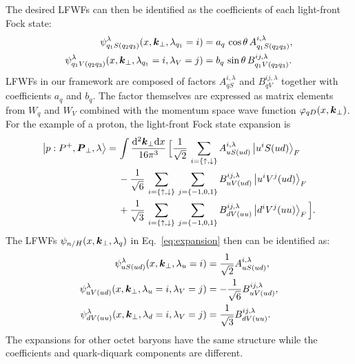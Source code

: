 \documentclass[aps,prc,preprint,groupedaddress,showpacs,superscriptaddress,floatfix]{revtex4-1}
\newcommand{\diff}{\ensuremath\mathrm{d}}
\renewcommand{\vec}[1]{\ensuremath\boldsymbol{#1}}
\begin{document}
%
The desired LFWFs can then be identified as the coefficients of each light-front Fock state:
%
\begin{align}
  \psi_{q_1S(q_2q_3)}^\lambda(x, \vec{k}_\perp, \lambda_{q_1}=i)  &= a_q\,\cos\theta\,A^{i, \lambda}_{q_1S(q_2q_3)}, \label{eq:lfwf1}\\
  \psi_{q_1V(q_2q_3)}^\lambda(x, \vec{k}_\perp, \lambda_{q_1}=i, \lambda_V=j) &= b_q\,\sin\theta\,B^{ij, \lambda}_{q_1V(q_2q_3)}.\label{eq:lfwf2}
\end{align}
%
LFWFs in our framework are composed of factors $A^{i,\lambda}_{qS}$ and $B^{ij,\lambda}_{qV}$ together with coefficients $a_q$ and $b_q$.
The factor themselves are expressed as matrix elements from $W_q$ and $W_V$ combined with the momentum space wave function $\varphi_{qD}(x,\vec{k}_\perp)$.
For the example of a proton, the light-front Fock state expansion is
%
\begin{align}
  \Ket{p:P^+,\vec{P}_\perp,\lambda} =&\,\int\frac{\diff^2 \vec{k}_\perp \diff x}{16\pi^3} 
  \,\Big[ \frac{1}{\sqrt{2}}\, \sum_{i=\{\uparrow,\downarrow\}}
  A^{i,\lambda}_{uS(ud)}\Ket{u^i S(ud)}_F \nonumber \\
  &\,- \frac{1}{\sqrt{6}}\,\sum_{i=\{\uparrow, \downarrow\}}\,\sum_{j=\{-1, 0, 1\}}
  B^{ij,\lambda}_{uV(ud)} \Ket{u^i V^j(ud)}_F \nonumber \\
  &\,+ \frac{1}{\sqrt{3}}\,\sum_{i=\{\uparrow, \downarrow\}}\,\sum_{j=\{-1, 0, 1\}}
  B^{ij,\lambda}_{dV(uu)} \Ket{d^i V^j(uu)}_F\Big]. \label{eq:plfexp}
\end{align}
%
The LFWFs $\psi_{n/H} (x, \vec{k}_{\perp}, \lambda_q)$ in Eq.~\eqref{eq:expansion} then can be identified as:
\begin{align}
  \psi_{uS(ud)}^\lambda(x, \vec{k}_\perp, \lambda_u=i)  &= \frac{1}{\sqrt{2}} A^{i, \lambda}_{uS(ud)}, \label{eq:plfwf_1}\\
  \psi_{uV(ud)}^\lambda(x, \vec{k}_\perp, \lambda_u=i, \lambda_V=j) &= -\frac{1}{\sqrt{6}} B^{ij, \lambda}_{uV(ud)},\\
  \psi_{dV(uu)}^\lambda(x, \vec{k}_\perp, \lambda_d=i, \lambda_V=j) &= \frac{1}{\sqrt{3}} B^{ij, \lambda}_{dV(uu)}. \label{eq:plfwf_3}
\end{align}
The expansions for other octet baryons have the same structure while the coefficients and quark-diquark components are different.
\end{document}
